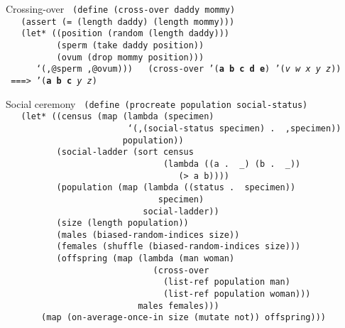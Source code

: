 \documentclass{beamer}
\begin{document}
\begin{frame}{Crossing-over}
  \texttt{
(define (cross-over daddy mommy)\\ \pause
\ \ \ (assert (= (length daddy) (length mommy)))\\ \pause
\ \ \ (let* ((position (random (length daddy)))\\ \pause
\ \ \ \ \ \ \ \ \ \ (sperm (take daddy position))\\ \pause
\ \ \ \ \ \ \ \ \ \ (ovum (drop mommy position)))\\ \pause
\ \ \ \ \ \ `(,@sperm ,@ovum))) \\ \pause
\ \\
(cross-over '(\textbf{a b c d e}) '(\textit{v w x y z})) \\ \pause
\ ===> '(\textbf{a b c} \textit{y z})
}
\end{frame}

\begin{frame}{Social ceremony}
  \texttt{\scriptsize
(define (procreate population social-status)\\ \pause
\ \ \ (let* ((census (map (lambda (specimen)\\
\ \ \ \ \ \ \ \ \ \ \ \ \ \ \ \ \ \ \ \ \ \ \ \
`(,(social-status specimen)\,.\,\,,specimen))\\
\ \ \ \ \ \ \ \ \ \ \ \ \ \ \ \ \ \ \ \ \ \ \ population))\\ \pause
\ \ \ \ \ \ \ \ \ \ (social-ladder (sort census \\
\ \ \ \ \ \ \ \ \ \ \ \ \ \ \ \ \ \ \ \ \ \ \ \ \ \ \ \ \ \ \ 
(lambda ((a .\,\,\_) (b .\,\,\_))\\
\ \ \ \ \ \ \ \ \ \ \ \ \ \ \ \ \ \ \ \ \ \ \ \ \ \ \ \ \ \ \ \ \ \
(> a b))))\\ \pause
\ \ \ \ \ \ \ \ \ \ (population (map (lambda ((status .\,\,specimen))\\
\ \ \ \ \ \ \ \ \ \ \ \ \ \ \ \ \ \ \ \ \ \ \ \ \ \ \ \ \ \ specimen)\\
\ \ \ \ \ \ \ \ \ \ \ \ \ \ \ \ \ \ \ \ \ \ \ \ \ \ \ social-ladder))\\ \pause
\ \ \ \ \ \ \ \ \ \ (size (length population))\\ \pause
\ \ \ \ \ \ \ \ \ \ (males (biased-random-indices size))\\ \pause
\ \ \ \ \ \ \ \ \ \ (females (shuffle (biased-random-indices size)))\\ \pause
\ \ \ \ \ \ \ \ \ \ (offspring (map (lambda (man woman)\\
\ \ \ \ \ \ \ \ \ \ \ \ \ \ \ \ \ \ \ \ \ \ \ \ \ \ \ \ \
(cross-over \\
\ \ \ \ \ \ \ \ \ \ \ \ \ \ \ \ \ \ \ \ \ \ \ \ \ \ \ \ \ \ \
(list-ref population man)\\
\ \ \ \ \ \ \ \ \ \ \ \ \ \ \ \ \ \ \ \ \ \ \ \ \ \ \ \ \ \ \
(list-ref population woman)))\\
\ \ \ \ \ \ \ \ \ \ \ \ \ \ \ \ \ \ \ \ \ \ \ \ \ \
males females)))\\ \pause
\ \ \ \ \ \ \ (map (on-average-once-in size (mutate not)) offspring)))
}
\end{frame}
\end{document}
